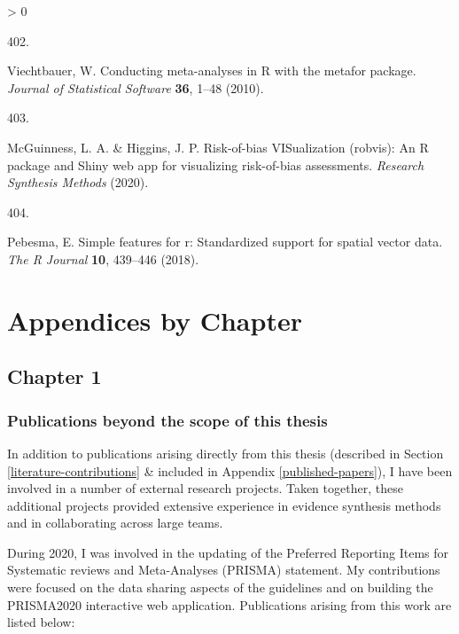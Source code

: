 \documentclass[a4paper, twoside]{templates/ociamthesis}
\newlength{\cslhangindent}
\newlength{\csllabelwidth}
\newenvironment{CSLReferences}[3] %
 {%
  \setlength{\parindent}{0pt}
  \ifodd #1 \everypar{\setlength{\hangindent}{\cslhangindent}}\ignorespaces\fi
  \ifnum #2 > 0
  \setlength{\parskip}{#2\baselineskip}
  \fi
 }%
 {}
\newcommand{\CSLLeftMargin}[1]{\parbox[t]{\maxof{\widthof{#1}}{\csllabelwidth}}{#1}}
\newcommand{\CSLRightInline}[1]{\parbox[t]{\linewidth - \csllabelwidth}{#1}}
\begin{document}
\begin{CSLReferences}{0}{0}
\leavevmode\hypertarget{ref-metafor2010}{}%
\CSLLeftMargin{402. }
\CSLRightInline{Viechtbauer, W. Conducting meta-analyses in {R} with the {metafor} package. \emph{Journal of Statistical Software} \textbf{36}, 1--48 (2010).}

\leavevmode\hypertarget{ref-robvis2020}{}%
\CSLLeftMargin{403. }
\CSLRightInline{McGuinness, L. A. \& Higgins, J. P. Risk-of-bias {VISualization} (robvis): An {R} package and {Shiny} web app for visualizing risk-of-bias assessments. \emph{Research Synthesis Methods} (2020).}

\leavevmode\hypertarget{ref-sf2018}{}%
\CSLLeftMargin{404. }
\CSLRightInline{Pebesma, E. Simple features for r: Standardized support for spatial vector data. \emph{The R Journal} \textbf{10}, 439--446 (2018).}

\end{CSLReferences}

\startappendices

\hypertarget{chapter-appendix-heading}{%
\chapter{Appendices by Chapter}\label{chapter-appendix-heading}}

\minitoc 

\newpage

\hypertarget{appendix-into}{%
\section{Chapter 1}\label{appendix-into}}

\hypertarget{appendix-publications}{%
\subsection{Publications beyond the scope of this thesis}\label{appendix-publications}}

In addition to publications arising directly from this thesis (described in Section \ref{literature-contributions} \& included in Appendix \ref{published-papers}), I have been involved in a number of external research projects. Taken together, these additional projects provided extensive experience in evidence synthesis methods and in collaborating across large teams.

During 2020, I was involved in the updating of the Preferred Reporting Items for Systematic reviews and Meta-Analyses (PRISMA) statement. My contributions were focused on the data sharing aspects of the guidelines and on building the PRISMA2020 interactive web application. Publications arising from this work are listed below:
\end{document}
